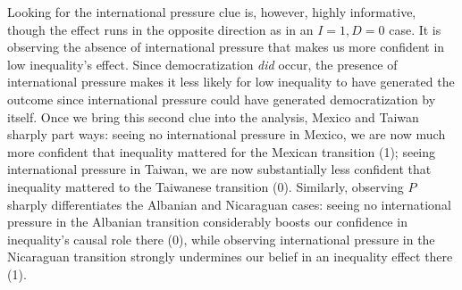 \documentclass[
  12pt,
]{book}
\begin{document}
\begin{table}

\caption{\label{tab:HK8cases1}Four cases with low inequality and  democratization. Question of interest: Was low inequality a cause of democracy? Table shows posterior beliefs for different data for four cases given information on $M$ or $P$. Data from Haggard and Kaufman (2012). Analyses here use priors assuming only monotonic effects.}
\centering
{}
\end{table}

Looking for the international pressure clue is, however, highly informative, though the effect runs in the opposite direction as in an \(I=1, D=0\) case. It is observing the absence of international pressure that makes us more confident in low inequality's effect. Since democratization \emph{did} occur, the presence of international pressure makes it less likely for low inequality to have generated the outcome since international pressure could have generated democratization by itself. Once we bring this second clue into the analysis, Mexico and Taiwan sharply part ways: seeing no international pressure in Mexico, we are now much more confident that inequality mattered for the Mexican transition (1); seeing international pressure in Taiwan, we are now substantially less confident that inequality mattered to the Taiwanese transition (0). Similarly, observing \(P\) sharply differentiates the Albanian and Nicaraguan cases: seeing no international pressure in the Albanian transition considerably boosts our confidence in inequality's causal role there (0), while observing international pressure in the Nicaraguan transition strongly undermines our belief in an inequality effect there (1).
\end{document}
